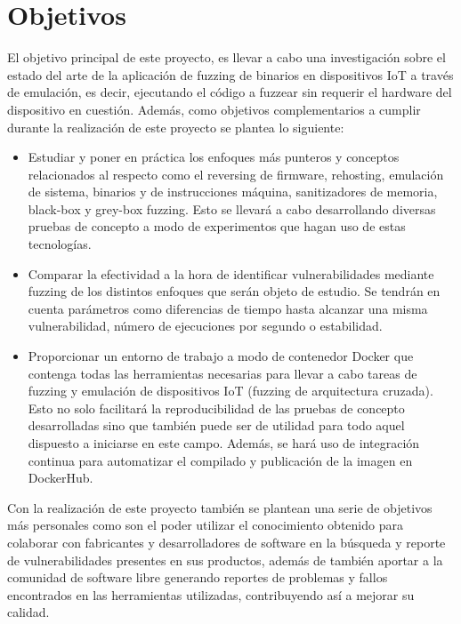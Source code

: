 \section{Objetivos}
El objetivo principal de este proyecto, es llevar a cabo una investigación sobre el estado del arte de la aplicación de fuzzing de binarios en dispositivos IoT
a través de emulación, es decir, ejecutando el código a fuzzear sin requerir el hardware del dispositivo en cuestión.
Además, como objetivos complementarios a cumplir durante la realización de este proyecto se plantea lo siguiente:
\begin{itemize}
    \item Estudiar y poner en práctica los enfoques más punteros y 
    conceptos relacionados al respecto como el reversing de firmware, rehosting, emulación de sistema, binarios y de instrucciones máquina, 
    sanitizadores de memoria, black-box y grey-box fuzzing. Esto se llevará a cabo desarrollando diversas pruebas de concepto a modo de 
    experimentos que hagan uso de estas tecnologías.
    \item Comparar la efectividad a la hora de identificar vulnerabilidades mediante fuzzing de los distintos enfoques que serán objeto de estudio. 
    Se tendrán en cuenta parámetros como diferencias de tiempo hasta alcanzar una misma vulnerabilidad, número de ejecuciones por segundo o estabilidad.
    \item Proporcionar un entorno de trabajo a modo de contenedor Docker que contenga todas las herramientas necesarias para llevar a cabo tareas de 
    fuzzing y emulación de dispositivos IoT (fuzzing de arquitectura cruzada). Esto no solo facilitará la reproducibilidad de las pruebas de 
    concepto desarrolladas sino que también puede ser de utilidad para todo aquel dispuesto a iniciarse en este campo. Además, se hará uso de 
    integración continua para automatizar el compilado y publicación de la imagen en DockerHub.
\end{itemize}

Con la realización de este proyecto también se plantean una serie de objetivos más personales como son el poder utilizar el conocimiento obtenido 
para colaborar con fabricantes y desarrolladores de software en la búsqueda y reporte de vulnerabilidades presentes en sus productos, además de también
aportar a la comunidad de software libre generando reportes de problemas y fallos encontrados en las herramientas utilizadas, contribuyendo así
a mejorar su calidad. 

